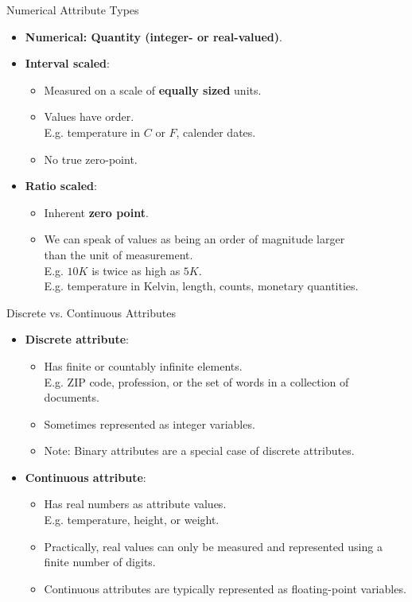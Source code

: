 \begin{frame}{Numerical Attribute Types}
	\begin{itemize}
		\item \textbf{Numerical: Quantity (integer- or real-valued)}.
		\item \textbf{Interval scaled}:
		      \begin{itemize}
			      \item Measured on a scale of \textbf{equally sized} units.
			      \item Values have order.\\
			            E.g. temperature in $C$ or $F$, calender dates.
			      \item No true zero-point.
		      \end{itemize}
		\item \textbf{Ratio scaled}:
		      \begin{itemize}
			      \item Inherent \textbf{zero point}.
			      \item We can speak of values as being an order of magnitude larger \\
			            than the unit of measurement.\\
			            E.g. $10 K$ is twice as high as $5 K$.\\
			            E.g. temperature in Kelvin, length, counts, monetary quantities.
		      \end{itemize}
	\end{itemize}
\end{frame}

\begin{frame}{Discrete vs. Continuous Attributes }
	\begin{itemize}
		\item \textbf{Discrete attribute}:
		      \begin{itemize}
			      \item Has finite or countably infinite elements.\\
			            E.g. ZIP code, profession, or the set of words in a collection of documents.
			      \item Sometimes represented as integer variables.
			      \item Note: Binary attributes are a special case of discrete attributes.
		      \end{itemize}
		\item \textbf{Continuous attribute}:
		      \begin{itemize}
			      \item Has real numbers as attribute values.\\
			            E.g. temperature, height, or weight.
			      \item Practically, real values can only be measured and represented using a finite number of digits.
			      \item Continuous attributes are typically represented as floating-point variables.
		      \end{itemize}
	\end{itemize}
\end{frame}
